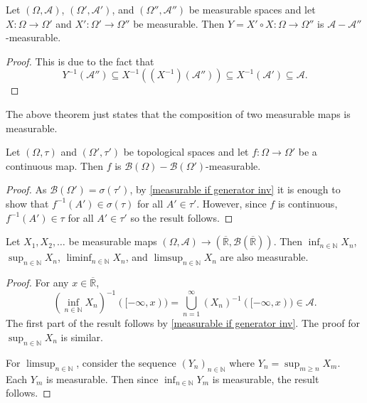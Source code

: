 \begin{theorem}
        Let $(\Omega,\mathcal{A})$, $(\Omega',\mathcal{A}')$, and $(\Omega'',\mathcal{A}'')$ be measurable spaces and let $X:\Omega\to\Omega'$ and $X':\Omega'\to\Omega''$ be measurable. Then $Y=X'\circ X:\Omega\to\Omega''$ is $\mathcal{A}-\mathcal{A}''$-measurable.
\end{theorem}
\begin{proof}
    This is due to the fact that
    $$Y^{-1}(\mathcal{A}'')\subseteq X^{-1}((X^{-1})(\mathcal{A}''))\subseteq X^{-1}(\mathcal{A}')\subseteq \mathcal{A}.$$
\end{proof}

The above theorem just states that the composition of two measurable maps is measurable.

\begin{theorem}
    Let $(\Omega,\tau)$ and $(\Omega',\tau')$ be topological spaces and let $f:\Omega\to\Omega'$ be a continuous map. Then $f$ is $\mathcal{B}(\Omega)-\mathcal{B}(\Omega')$-measurable.
\end{theorem}
\begin{proof}
    As $\mathcal{B}(\Omega')=\sigma(\tau')$, by \cref{measurable if generator inv} it is enough to show that $f^{-1}(A')\in\sigma(\tau)$ for all $A'\in\tau'$. However, since $f$ is continuous, $f^{-1}(A')\in\tau$ for all $A'\in\tau'$ so the result follows.
\end{proof}

\begin{theorem}
    Let $X_1,X_2,\ldots$ be measurable maps $(\Omega,\mathcal{A})\to(\overline{\mathbb{R}}, \mathcal{B}(\overline{\mathbb{R}}))$. Then $\displaystyle\inf_{n\in\mathbb{N}}X_n$, $\displaystyle\sup_{n\in\mathbb{N}}X_n$, $\displaystyle\liminf_{n\in\mathbb{N}}X_n$, and $\displaystyle\limsup_{n\in\mathbb{N}}X_n$ are also measurable.
\end{theorem}
\begin{proof}
    For any $x\in\overline{\mathbb{R}}$,
    $$\left(\inf_{n\in\mathbb{N}}X_n\right)^{-1}([-\infty,x))=\bigcup_{n=1}^\infty (X_n)^{-1}([-\infty,x))\in\mathcal{A}.$$
    The first part of the result follows by \cref{measurable if generator inv}. The proof for $\sup_{n\in\mathbb{N}}X_n$ is similar.
    
    For $\limsup_{n\in\mathbb{N}}$, consider the sequence $(Y_n)_{n\in\mathbb{N}}$ where $Y_n=\sup_{m\geq n}X_m$. Each $Y_m$ is measurable. Then since $\inf_{n\in\mathbb{N}}Y_m$ is measurable, the result follows.
\end{proof}

